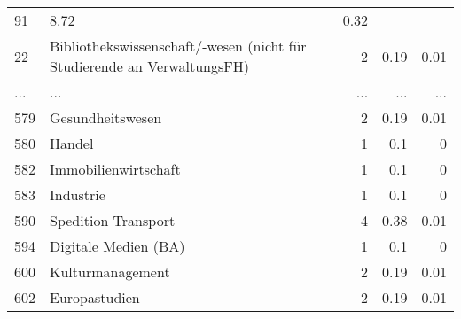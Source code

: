 \begin{longtable}{lXrrr}
          \num{91} &
          \num[round-mode=places,round-precision=2]{8,72} &
          \num[round-mode=places,round-precision=2]{0,32} \\
        22 & \multicolumn{1}{X}{Bibliothekswissenschaft/-wesen (nicht für Studierende an VerwaltungsFH)} & %
          \num{2} &
          \num[round-mode=places,round-precision=2]{0,19} &
          \num[round-mode=places,round-precision=2]{0,01} \\
       ... & ... & ... & ... & ... \\
        579 & \multicolumn{1}{X}{Gesundheitswesen} & %
          \num{2} &
          \num[round-mode=places,round-precision=2]{0,19} &
          \num[round-mode=places,round-precision=2]{0,01} \\

        580 & \multicolumn{1}{X}{Handel} & %
          \num{1} &
          \num[round-mode=places,round-precision=2]{0,1} &
          \num[round-mode=places,round-precision=2]{0} \\

        582 & \multicolumn{1}{X}{Immobilienwirtschaft} & %
          \num{1} &
          \num[round-mode=places,round-precision=2]{0,1} &
          \num[round-mode=places,round-precision=2]{0} \\

        583 & \multicolumn{1}{X}{Industrie} & %
          \num{1} &
          \num[round-mode=places,round-precision=2]{0,1} &
          \num[round-mode=places,round-precision=2]{0} \\

        590 & \multicolumn{1}{X}{Spedition Transport} & %
          \num{4} &
          \num[round-mode=places,round-precision=2]{0,38} &
          \num[round-mode=places,round-precision=2]{0,01} \\

        594 & \multicolumn{1}{X}{Digitale Medien (BA)} & %
          \num{1} &
          \num[round-mode=places,round-precision=2]{0,1} &
          \num[round-mode=places,round-precision=2]{0} \\

        600 & \multicolumn{1}{X}{Kulturmanagement} & %
          \num{2} &
          \num[round-mode=places,round-precision=2]{0,19} &
          \num[round-mode=places,round-precision=2]{0,01} \\

        602 & \multicolumn{1}{X}{Europastudien} & %
          \num{2} &
          \num[round-mode=places,round-precision=2]{0,19} &
          \num[round-mode=places,round-precision=2]{0,01} \\


\end{longtable}
